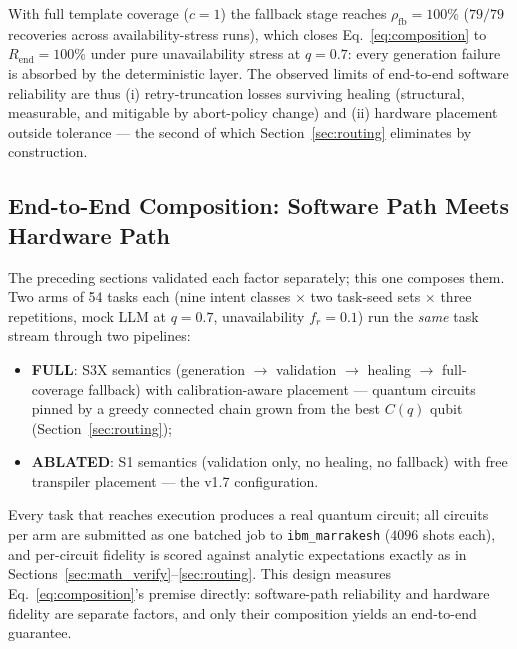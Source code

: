 ﻿\documentclass[12pt,a4paper]{article}
\begin{document}
With full template coverage ($c{=}1$) the fallback stage reaches $\rho_{\mathrm{fb}} = 100\%$ ($79/79$ recoveries across availability-stress runs), which closes Eq.~\eqref{eq:composition} to $R_{\mathrm{end}} = 100\%$ under pure unavailability stress at $q = 0.7$: every generation failure is absorbed by the deterministic layer. The observed limits of end-to-end software reliability are thus (i) retry-truncation losses surviving healing (structural, measurable, and mitigable by abort-policy change) and (ii) hardware placement outside tolerance --- the second of which Section~\ref{sec:routing} eliminates by construction.

\subsection{End-to-End Composition: Software Path Meets Hardware Path}\label{sec:e2e}

The preceding sections validated each factor separately; this one composes them. Two arms of 54 tasks each (nine intent classes $\times$ two task-seed sets $\times$ three repetitions, mock LLM at $q = 0.7$, unavailability $f_r = 0.1$) run the \emph{same} task stream through two pipelines:
\begin{itemize}
    \item \textbf{FULL}: S3X semantics (generation $\rightarrow$ validation $\rightarrow$ healing $\rightarrow$ full-coverage fallback) with calibration-aware placement --- quantum circuits pinned by a greedy connected chain grown from the best $C(q)$ qubit (Section~\ref{sec:routing});
    \item \textbf{ABLATED}: S1 semantics (validation only, no healing, no fallback) with free transpiler placement --- the v1.7 configuration.
\end{itemize}
Every task that reaches execution produces a real quantum circuit; all circuits per arm are submitted as one batched job to \texttt{ibm\_marrakesh} ($4096$ shots each), and per-circuit fidelity is scored against analytic expectations exactly as in Sections~\ref{sec:math_verify}--\ref{sec:routing}. This design measures Eq.~\eqref{eq:composition}'s premise directly: software-path reliability and hardware fidelity are separate factors, and only their composition yields an end-to-end guarantee.
\end{document}
